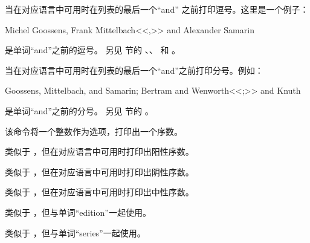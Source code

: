 \begin{ltxsyntax}

当在对应语言中可用时在列表的最后一个“and” 之前打印逗号。这里是一个例子：

\begin{ltxexample}
Michel Goossens, Frank Mittelbach<<,>> and Alexander Samarin
\end{ltxexample}
%
 是单词“and”之前的逗号。
另见  节的 、、 和 。


当在对应语言中可用时在列表的最后一个“and”之前打印分号。例如：

\begin{ltxexample}
Goossens, Mittelbach, and Samarin; Bertram and Wenworth<<;>> and Knuth
\end{ltxexample}
%
 是单词“and”之前的分号。
另见  节的 。


该命令将一个整数作为选项，打印出一个序数。


类似于 ，但在对应语言中可用时打印出阳性序数。


类似于 ，但在对应语言中可用时打印出阴性序数。


类似于 ，但在对应语言中可用时打印出中性序数。


类似于 ，但与单词“edition”一起使用。


类似于 ，但与单词“series”一起使用。

\end{ltxsyntax}

